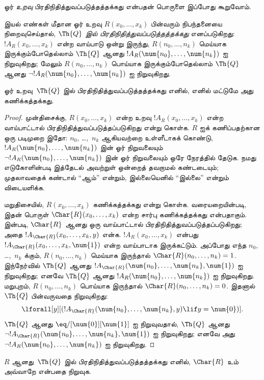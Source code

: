 \documentclass[../../../include/open-logic-section]{subfiles}
\begin{document}



ஓர் \emph{உறவு} பிரதிநிதித்துவப்படுத்தத்தக்கது என்பதன் பொருளை இப்போது
கூறுவோம்.

\begin{defn}
 இயல் எண்கள் மீதான ஓர் உறவு
$R(x_0,\dots,x_k)$ பின்வரும் நிபந்தனையை நிறைவுசெய்தால்,
{\em $\Th{Q}$ இல் பிரதிநிதித்துவப்படுத்தத்தக்கது} எனப்படுகிறது:
$!A_R(x_0,\dots,x_k)$ என்ற வாய்பாடு ஒன்று இருந்து,
$R(n_0,\dots,n_k)$ மெய்யாக இருக்கும்போதெல்லாம் $\Th{Q}$ ஆனது
$!A_R(\num{n_0},\dots,\num{n_k})$ ஐ நிறுவுகிறது; மேலும்
$R(n_0,\dots,n_k)$ பொய்யாக இருக்கும்போதெல்லாம் $\Th{Q}$ ஆனது
$\lnot !A_R(\num{n_0}, \dots, \num{n_k})$ ஐ நிறுவுகிறது.
\end{defn}

\begin{thm}
 ஓர் உறவு~$\Th{Q}$ இல்
பிரதிநிதித்துவப்படுத்தத்தக்கது எனில், எனில் மட்டுமே அது கணிக்கத்தக்கது.
\end{thm}

\begin{proof}
முன்திசைக்கு, $R(x_0,\dots,x_k)$ என்ற உறவு
$!A_R(x_0,\dots,x_k)$ என்ற வாய்பாட்டால்
பிரதிநிதித்துவப்படுத்தப்படுகிறது என்று கொள்க. $R$ ஐக் கணிப்பதற்கான
ஒரு படிமுறை இதோ: $n_0$, \dots,~$n_k$ ஆகியவற்றை உள்ளீடாகக் கொண்டு,
$!A_R(\num{n_0}, \dots, \num{n_k})$ இன் ஓர் நிறுவலையும்
$\lnot !A_R(\num{n_0}, \dots, \num{n_k})$ இன் ஓர் நிறுவலையும் ஒரே நேரத்தில்
தேடுக. நமது எடுகோளின்படி இத்தேடல் அவற்றுள் ஒன்றைத் தவறாமல் கண்டடையும்;
முதலாவதைக் கண்டால் “ஆம்” என்றும், இல்லையெனில் “இல்லை” என்றும்
விடையளிக்க.

மறுதிசையில், $R(x_0, \dots, x_k)$ கணிக்கத்தக்கது என்று கொள்க.
வரையறையின்படி, இதன் பொருள் $\Char{R}(x_0, \dots, x_k)$ என்ற சார்பு
கணிக்கத்தக்கது என்பதாகும். 
இன்படி, $\Char{R}$ ஆனது ஒரு வாய்பாட்டால் பிரதிநிதித்துவப்படுத்தப்படுகிறது;
அதை $!A_{\Char{R}}(x_0, \dots, x_k, y)$ என்க. $!A_R(x_0, \dots, x_k)$
என்பது $!A_{\Char{R}}(x_0, \dots, x_k, \num{1})$ என்ற வாய்பாடாக
இருக்கட்டும். அப்போது எந்த $n_0$, \dots,~$n_k$ க்கும்,
$R(n_0, \dots, n_k)$ மெய்யாக இருந்தால்
$\Char{R}(n_0, \dots, n_k) = 1$. இந்நேர்வில் $\Th{Q}$ ஆனது
$!A_{\Char{R}}(\num{n_0}, \dots, \num{n_k}, \num{1})$ ஐ நிறுவுகிறது;
எனவே $\Th{Q}$ ஆனது $!A_R(\num{n_0}, \dots, \num{n_k})$ ஐ நிறுவுகிறது.
மறுபுறம், $R(n_0, \dots, n_k)$ பொய்யாக இருந்தால்
$\Char{R}(n_0, \dots, n_k) = 0$. இதனால் $\Th{Q}$ பின்வருவதை நிறுவுகிறது:
\[
\lforall[y][(!A_{\Char{R}}(\num{n_0}, \dots, \num{n_k}, y) \lif y =
  \num{0})].
\]
$\Th{Q}$ ஆனது $\eq/[\num{0}][\num{1}]$ ஐ நிறுவுவதால்,
$\Th{Q}$ ஆனது
$\lnot !A_{\Char{R}}(\num{n_0}, \dots, \num{n_k}, \num{1})$ ஐ
நிறுவுகிறது; எனவே அது
$\lnot !A_R(\num{n_0}, \dots, \num{n_k})$ ஐ நிறுவுகிறது.
\end{proof}

\begin{prob}
$R$ ஆனது~$\Th{Q}$ இல் பிரதிநிதித்துவப்படுத்தத்தக்கது எனில்,
$\Char{R}$ உம் அவ்வாறே என்பதை நிறுவுக.
\end{prob}
\end{document}
